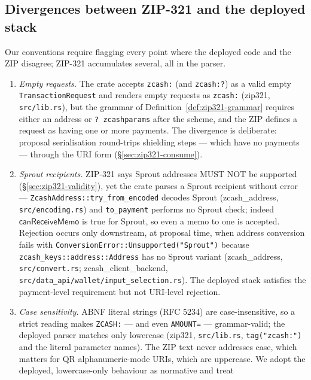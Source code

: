 \documentclass[11pt,a4paper]{article}
\theoremstyle{definition}
\begin{document}
\subsection{Divergences between ZIP-321 and the deployed stack}
\label{sec:zip321-divergences}

Our conventions require flagging every point where the deployed code and the
ZIP disagree; ZIP-321 accumulates several, all in the parser.

\begin{enumerate}[label=(D\arabic*)]
\item \emph{Empty requests.} The crate accepts \texttt{zcash:} (and
  \texttt{zcash:?}) as a valid empty \texttt{TransactionRequest} and renders
  empty requests as \texttt{zcash:} (\textsf{zip321}, \texttt{src/lib.rs}),
  but the grammar of Definition~\ref{def:zip321-grammar} requires either an
  address or \texttt{?~zcashparams} after the scheme, and the ZIP defines a
  request as having one or more payments. The divergence is deliberate:
  proposal serialisation round-trips shielding steps --- which have no
  payments --- through the URI form (\S\ref{sec:zip321-consume}).
\item \emph{Sprout recipients.} ZIP-321 says Sprout addresses MUST NOT be
  supported (\S\ref{sec:zip321-validity}), yet the crate parses a Sprout
  recipient without error --- \texttt{ZcashAddress::try\_from\_encoded}
  decodes Sprout (\textsf{zcash\_address}, \texttt{src/encoding.rs}) and
  \texttt{to\_payment} performs no Sprout check; indeed
  $\mathsf{canReceiveMemo}$ is true for Sprout, so even a memo to one is
  accepted. Rejection occurs only downstream, at proposal time, when address
  conversion fails with \texttt{ConversionError::Unsupported("Sprout")}
  because \texttt{zcash\_keys::address::Address} has no Sprout variant
  (\textsf{zcash\_address}, \texttt{src/convert.rs};
  \textsf{zcash\_client\_backend},
  \texttt{src/data\_api/wallet/input\_selection.rs}). The deployed stack
  satisfies the payment-level requirement but not URI-level rejection.
\item \emph{Case sensitivity.} ABNF literal strings (RFC 5234) are
  case-insensitive, so a strict reading makes \texttt{ZCASH:} --- and even
  \texttt{AMOUNT=} --- grammar-valid; the deployed parser matches only
  lowercase (\textsf{zip321}, \texttt{src/lib.rs}, \texttt{tag("zcash:")}
  and the literal parameter names). The ZIP text never addresses case,
  which matters for QR alphanumeric-mode URIs, which are uppercase.
  We adopt the deployed, lowercase-only behaviour as normative and treat

\end{enumerate}
\end{document}
